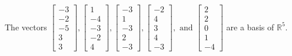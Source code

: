 \begin{exercise}
\begin{exerciseStatement}
  \end{exerciseStatement}
  \begin{exerciseAnswer}
   The vectors \(\left[\begin{array}{r}
-3 \\
-2 \\
-5 \\
3 \\
3
\end{array}\right] , \left[\begin{array}{r}
1 \\
-4 \\
-3 \\
-2 \\
4
\end{array}\right] , \left[\begin{array}{r}
-3 \\
1 \\
-3 \\
2 \\
-3
\end{array}\right] , \left[\begin{array}{r}
-2 \\
4 \\
3 \\
4 \\
-3
\end{array}\right] , \text{ and } \left[\begin{array}{r}
2 \\
2 \\
0 \\
1 \\
-4
\end{array}\right]\) 
  	 are  a basis of \(\mathbb{R}^5\).
  


  \end{exerciseAnswer}
\end{exercise}